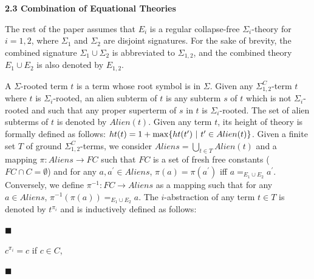 \documentclass[10pt,a4paper]{amsart}
\begin{document}
 
 
 
\par\medskip\noindent\textbf{2.3 Combination of Equational Theories}\par
 
 
The rest of the paper assumes that $E_{i}$ is a regular collapse-free $\Sigma_{i}$-theory for $i=1,2$, where $\Sigma_{1}$ and $\Sigma_{2}$ are disjoint signatures. For the sake of brevity, the combined signature $\Sigma_{1}\cup\Sigma_{2}$ is abbreviated to $\Sigma_{1,2}$, and the combined theory $E_{1}\cup E_{2}$ is also denoted by $E_{1,2}$.\par
 
 
 
A $\Sigma$-rooted term $t$ is a term whose root symbol is in $\Sigma$. Given any ${\Sigma}^{C}_{1,2}$-term $t$ where $t$ is $\Sigma_{i}$-rooted, an alien subterm of $t$ is any subterm $s$ of $t$ which is not $\Sigma_{i}$-rooted and such that any proper superterm of $s$ in $t$ is $\Sigma_{i}$-rooted. The set of alien subterms of $t$ is denoted by $Alien(t)$. Given any term $t$, its height of theory is formally defined as follows: $ht(t)=1+\max\{ht(t^{\prime})\leavevmode\nobreak\ |\leavevmode\nobreak\ t^{\prime}\in Alien(t)\}$. Given a finite set $T$ of ground ${\Sigma}^{C}_{1,2}$-terms, we consider $Aliens=\bigcup_{t\in T}\mathit{Alien}(t)$ and a mapping $\pi:Aliens\rightarrow FC$ such that $FC$ is a set of fresh free constants ($FC\cap C=\emptyset$) and for any $a,a^{\prime}\in Aliens$, $\pi(a)=\pi(a^{\prime})$ iff $a=_{E_{1}\cup E_{2}}a^{\prime}$. Conversely, we define $\pi^{-1}:FC\rightarrow Aliens$ as a mapping such that for any $a\in Aliens$, $\pi^{-1}(\pi(a))=_{E_{1}\cup E_{2}}a$. The $i$-abstraction of any term $t\in T$ is denoted by $t^{\pi_{i}}$ and is inductively defined as follows:\par
  
\par\noindent  $\blacksquare$ 
 
$c^{\pi_{i}}=c$ if $c\in C$,\par
 
 
 
\par\noindent  $\blacksquare$ 
 
\end{document}
